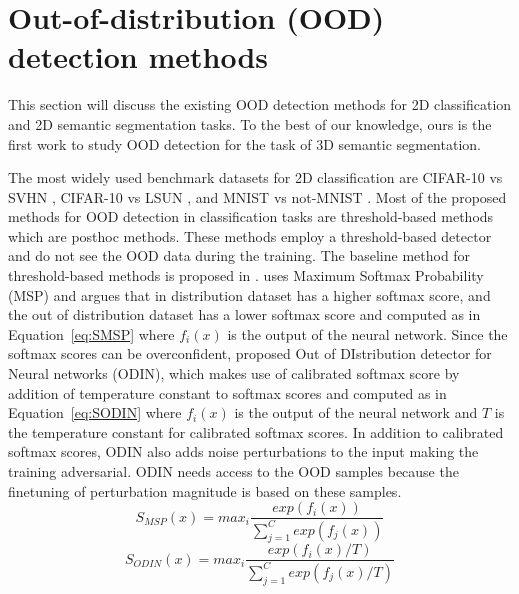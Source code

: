     
    
    \section{Out-of-distribution (OOD) detection methods}
    This section will discuss the existing OOD detection methods for 2D classification and 2D semantic segmentation tasks.
    To the best of our knowledge, ours is the first work to study OOD detection for the task of 3D semantic segmentation.

    The most widely used benchmark datasets for 2D classification are CIFAR-10 vs SVHN \cite{liang2017enhancing_ODIN}, CIFAR-10 vs LSUN \cite{hendrycks2016baseline_MSP}, and MNIST vs not-MNIST \cite{hendrycks2016baseline_MSP}. 
    Most of the proposed methods for OOD detection in classification tasks are threshold-based methods which are posthoc methods.
    These methods employ a threshold-based detector and do not see the OOD data during the training.
    The baseline method for threshold-based methods is proposed in \cite{hendrycks2016baseline_MSP}.
    \cite{hendrycks2016baseline_MSP} uses Maximum Softmax Probability (MSP) and argues that in distribution dataset has a higher softmax score, and the out of distribution dataset has a lower softmax score and computed as in Equation~\ref{eq:SMSP} where $f_i(x)$ is the output of the neural network.
    Since the softmax scores can be overconfident, \cite{liang2017enhancing_ODIN} proposed Out of DIstribution detector for Neural networks (ODIN), which makes use of calibrated softmax score by addition of temperature constant to softmax scores and computed as in Equation~\ref{eq:SODIN} where $f_i(x)$ is the output of the neural network and $T$ is the temperature constant for calibrated softmax scores.
    In addition to calibrated softmax scores, ODIN also adds noise perturbations to the input making the training adversarial.
    ODIN needs access to the OOD samples because the finetuning of perturbation magnitude is based on these samples.
    \begin{equation}
        S_{MSP}(x) = max_i \frac{exp(f_i(x))}{\sum^{C}_{j=1}exp(f_j(x))}  \label{eq:SMSP}
    \end{equation}
    \begin{equation}
        S_{ODIN}(x) = max_i \frac{exp(f_i(x)/T)}{\sum^{C}_{j=1}exp(f_j(x)/T)}  \label{eq:SODIN}
    \end{equation}
